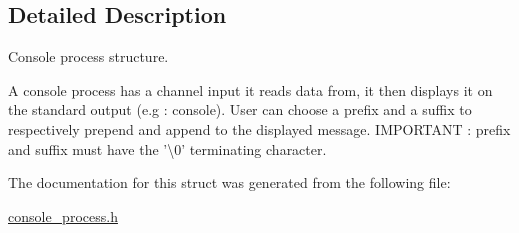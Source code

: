 \subsection{Detailed Description}
Console process structure. 

A console process has a channel input it reads data from, it then displays it on the standard output (e.\-g \-: console). User can choose a prefix and a suffix to respectively prepend and append to the displayed message. I\-M\-P\-O\-R\-T\-A\-N\-T \-: prefix and suffix must have the '\textbackslash{}0' terminating character. 

The documentation for this struct was generated from the following file\-:\begin{DoxyCompactItemize}
\item 
\hyperlink{console__process_8h}{console\-\_\-process.\-h}\end{DoxyCompactItemize}

